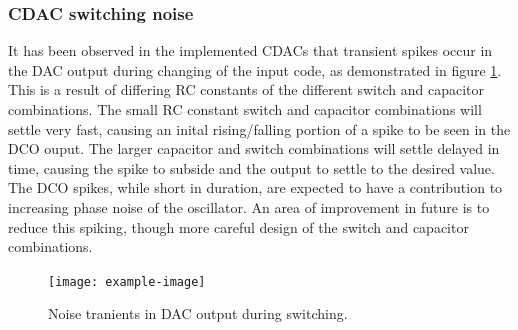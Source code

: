 	\subsubsection{CDAC switching noise}	
		It has been observed in the implemented CDACs that transient spikes occur in the DAC output during changing of the input code, as demonstrated in figure \ref{fig:dac_sw_noise}. This is a result of differing RC constants of the different switch and capacitor combinations.  The small RC constant switch and capacitor combinations will settle very fast, causing an inital rising/falling portion of a spike to be seen in the DCO ouput. The larger capacitor and switch combinations will settle delayed in time, causing the spike to subside and the output to settle to the desired value. The DCO spikes, while short in duration, are expected to have a contribution to increasing phase noise of the oscillator. An area of improvement in future is to reduce this spiking, though more careful design of the switch and capacitor combinations. 
		\begin{figure}[htb!]
	        \centering
	        \texttt{[image: example-image]}
		    \caption{Noise tranients in DAC output during switching.}
		    \label{fig:dac_sw_noise}
		\end{figure}


\FloatBarrier
